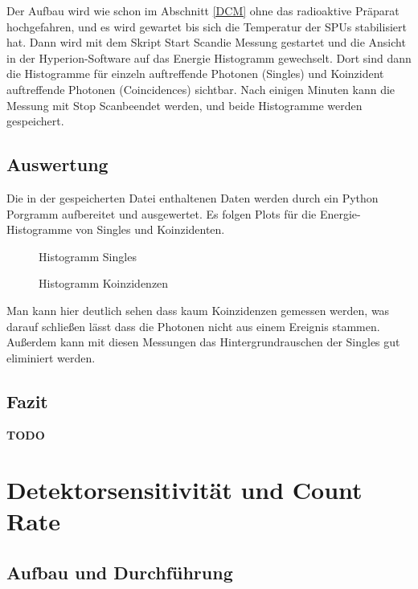 \documentclass[12pt,twoside,a4paper]{scrartcl}
\begin{document}
		Der Aufbau wird wie schon im Abschnitt \ref{DCM} ohne das radioaktive Präparat hochgefahren, und es wird gewartet bis sich die Temperatur der SPUs stabilisiert hat.
		Dann wird mit dem Skript \glqq Start Scan\grqq die Messung gestartet und die Ansicht in der Hyperion-Software auf das Energie Histogramm gewechselt. Dort sind dann die Histogramme für einzeln auftreffende Photonen (Singles) und Koinzident auftreffende Photonen (Coincidences) sichtbar. Nach einigen Minuten kann die Messung mit \glqq Stop Scan\grqq beendet werden, und beide Histogramme werden gespeichert.

		\subsection{Auswertung}

		Die in der gespeicherten Datei enthaltenen Daten werden durch ein Python Porgramm aufbereitet und ausgewertet.
		Es folgen Plots für die Energie-Histogramme von Singles und Koinzidenten.

		\begin{figure}
				\begin{minipage}{0.49 \textwidth}
					\caption{Histogramm Singles}
				\end{minipage}
				\begin{minipage}{0.49 \textwidth}
						\caption{Histogramm Koinzidenzen}
					\end{minipage}
		\end{figure}

		Man kann hier deutlich sehen dass kaum Koinzidenzen gemessen werden, was darauf schließen lässt dass die Photonen nicht aus einem Ereignis stammen.
		Außerdem kann mit diesen Messungen das Hintergrundrauschen der Singles gut eliminiert werden.

		\subsection{Fazit}

		\textbf{TODO}

	\section{Detektorsensitivität und Count Rate}

		\subsection{Aufbau und Durchführung}
\end{document}

